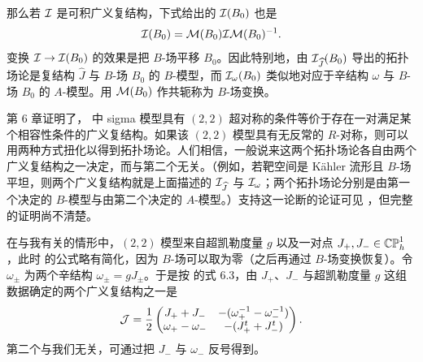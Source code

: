 那么若 ${\cal I}$ 是可积广义复结构，下式给出的 ${\cal I}(B_0)$ 也是 %
\setcounter{equation}{25}
\begin{equation}\label{eq:nyt}
{\cal I}(B_0)={\cal M}(B_0){\cal I}{\cal
M}(B_0)^{-1}.
\end{equation}
变换 ${\cal I}\to {\cal I}(B_0)$ 的效果是把 $B$-场平移 $B_0$。因此特别地，由 ${\cal I}_{\hat J}(B_0)$ 导出的拓扑场论是复结构 ${\hat J}$ 与 $B$-场 $B_0$ 的 $B$-模型，而 ${\cal I}_\omega(B_0)$ 类似地对应于辛结构 $\omega$ 与 $B$-场 $B_0$ 的 $A$-模型。用 ${\cal M}(B_0)$ 作共轭称为 $B$-场变换。

\cite{ref67} 第 6 章证明了，\cite{ref66} 中 sigma 模型具有 $(2,2)$ 超对称的条件等价于存在一对满足某个相容性条件的广义复结构。如果该 $(2,2)$ 模型具有无反常的 $R$-对称，则可以用两种方式扭化以得到拓扑场论。人们相信，一般说来这两个拓扑场论各自由两个广义复结构之一决定，而与第二个无关。（例如，若靶空间是 Kähler 流形且 $B$-场平坦，则两个广义复结构就是上面描述的 ${\cal I}_{\hat J}$ 与 ${\cal I}_\omega$；两个拓扑场论分别是由第一个决定的 $B$-模型与由第二个决定的 $A$-模型。）支持这一论断的论证可见 \cite{ref72,ref68}，但完整的证明尚不清楚。

在与我有关的情形中，$(2,2)$ 模型来自超凯勒度量 $g$ 以及一对点 $J_+,J_-\in \Bbb{CP}^1_h$，此时 \cite{ref67} 的公式略有简化，因为 $B$-场可以取为零（之后再通过 $B$-场变换恢复）。令 $\omega_\pm$ 为两个辛结构 $\omega_\pm = gJ_\pm$。于是按 \cite{ref67} 的式 6.3，由 $J_+$、$J_-$ 与超凯勒度量 $g$ 这组数据确定的两个广义复结构之一是 %
\setcounter{equation}{26}
\begin{equation}\label{eq:ugg}
{\cal J}={1\over 2}\left(\begin{matrix}J_++J_- &
-(\omega_+^{-1}-\omega_-^{-1})\\ \omega_+-\omega_- &
-(J_+^t+J_-^t)\\\end{matrix}\right).
\end{equation}
第二个与我们无关，可通过把 $J_-$ 与 $\omega_-$ 反号得到。

